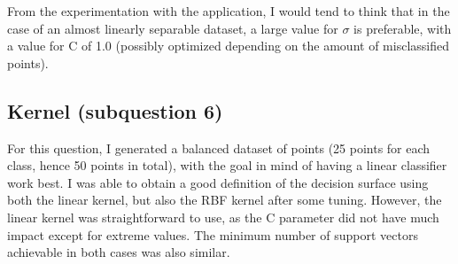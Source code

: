 \documentclass[11pt, a4paper]{article}
\begin{document}
From the experimentation with the application, I would tend to think
that in the case of an almost linearly separable dataset, a large
value for $\sigma$ is preferable, with a value for C of 1.0 (possibly
optimized depending on the amount of misclassified points).

\subsection{Kernel (subquestion 6)}

For this question, I generated a balanced dataset of points (25 points
for each class, hence 50 points in total), with the goal in mind of
having a linear classifier work best. I was able to obtain a good
definition of the decision surface using both the linear kernel, but
also the RBF kernel after some tuning. However, the linear kernel was
straightforward to use, as the C parameter did not have much impact
except for extreme values. The minimum number of support vectors
achievable in both cases was also similar. 
\end{document}
